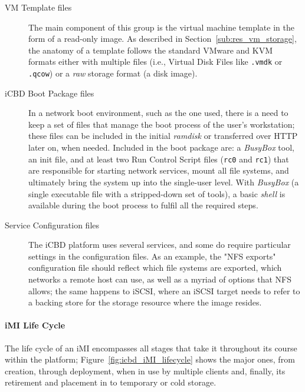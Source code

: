 \begin{description}
	\item [VM Template files] The main component of this group is the virtual machine template in the form of a read-only image. As described in Section~\ref{sub:res_vm_storage}, the anatomy of a template follows the standard VMware and KVM formats either with multiple files (i.e., Virtual Disk Files like \texttt{.vmdk} or \texttt{.qcow}) or a \textit{raw} storage format (a disk image).
	\item [iCBD Boot Package files] In a network boot environment, such as the one used, there is a need to keep a set of files that manage the boot process of the user’s workstation; these files can be included in the initial \textit{ramdisk} or transferred over HTTP later on, when needed. Included in the boot package are: a \textit{BusyBox} tool, an init file, and at least two Run Control Script files (\texttt{rc0} and \texttt{rc1}) that are responsible for starting network services, mount all file systems, and ultimately bring the system up into the single-user level. With \textit{BusyBox} (a single executable file with a stripped-down set of tools), a basic \textit{shell} is available during the boot process to fulfil all the required steps.
	\item [Service Configuration files] The iCBD platform uses several services, and some do require particular settings in the configuration files. As an example, the "NFS exports" configuration file should reflect which file systems are exported, which networks a remote host can use, as well as a myriad of options that NFS allows; the same happens to iSCSI, where an iSCSI target needs to refer to a backing store for the storage resource where the image resides. 
\end{description}

\paragraph{iMI Life Cycle}
\label{subsub:icbd_imi_lifecycle}

The life cycle of an iMI encompasses all stages that take it throughout its course within the platform; Figure~\ref{fig:icbd_iMI_lifecycle} shows the major ones, from creation, through deployment, when in use by multiple clients and, finally, its retirement and placement in to temporary or cold storage.

